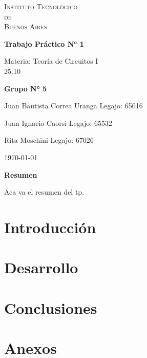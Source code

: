 \documentclass{article}
\title
\newcommand{\Facultad}{Instituto Tecnológico \\de\\ Buenos Aires} %
\newcommand{\TPn}{Trabajo Práctico N° 1}
\begin{document}
    \begin{titlepage} %
        \centering
            
        {\scshape\LARGE \Facultad \par} %
        \vspace{1cm}                    %


        {\huge\bfseries \TPn \par}
        \vspace{1.5cm}
        {\Large Materia: Teoría de Circuitos I\\ 25.10 \par}
        \vfill                      %
        {\Large \bfseries Grupo N° 5 \par}
        \vspace{1cm}
        {\large Juan Bautista Correa Uranga \hfill Legajo: 65016 \par} %
        {\large Juan Ignacio Caorsi \hfill Legajo: 65532  \par}
        {\large Rita Moschini \hfill Legajo: 67026 \par} 
        \vfill
        {\large \today\par}
        \vfil

    \end{titlepage}


    {\centering \LARGE \bfseries Resumen \par}
        Aca va el resumen del tp. \par
    \newpage

    \tableofcontents %
    \newpage

    \section{Introducción}

    \section{Desarrollo}

    \section{Conclusiones}

    \section{Anexos}
\end{document}
